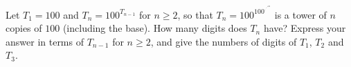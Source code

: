 Let $T_1=100$ and $T_n=100^{T_{n-1}}$ for $n\ge2$, so that $T_n=100^{100^{\cdot^{\cdot^{\cdot^{100}}}}}$ is a tower of $n$ copies of $100$ (including the base). How many digits does $T_n$ have? Express your answer in terms of $T_{n-1}$ for $n\ge2$, and give the numbers of digits of $T_1$, $T_2$ and $T_3$.

